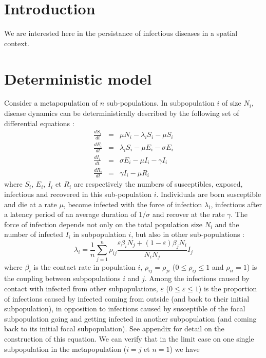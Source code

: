 \documentclass[a4paper,10pt]{article}
\begin{document}
\section{Introduction}

We are interested here in the persistance of infectious diseases in a spatial context.

\section{Deterministic model}

Consider a metapopulation of $n$ sub-populations. In subpopulation $i$ of size $N_i$, disease dynamics can be deterministically described by the following set of differential equations \cite{Anderson1991a}:
\begin{eqnarray}
  \frac{dS_{i}}{dt} & = & \mu N_{i}-\lambda_{i}S_{i}-\mu S_{i}\label{eq:dS} \\
  \frac{dE_{i}}{dt} & = & \lambda_{i}S_{i}-\mu E_{i}-\sigma E_{i} \\
  \frac{dI_{i}}{dt} & = & \sigma E_{i}-\mu I_{i}-\gamma I_{i}\label{eq:infectieux} \\
  \frac{dR_{i}}{dt} & = & \gamma I_{i}-\mu R_{i}\label{eq:dR}
\end{eqnarray}
where $S_i$, $E_i$, $I_i$ et $R_i$ are respectively the numbers of susceptibles, exposed, infectious and recovered in this sub-population $i$. Individuals are born susceptible and die at a rate $\mu$, become infected with the force of infection $\lambda_i$, infectious after a latency period of an average duration of $1/\sigma$ and recover at the rate $\gamma$. The force of infection depends not only on the total population size $N_i$ and the number of infected $I_i$ in subpopulation $i$, but also in other sub-populations \cite{Keeling2002b,Keeling2008b} :
\begin{equation} \label{eq:force}
  \lambda_i = \frac{1}{n}\sum_{j=1}^n\rho_{ij}\frac{\varepsilon \beta_iN_j+(1-\varepsilon)\beta_jN_i}{N_i N_j}I_j
\end{equation}
where $\beta_i$ is the contact rate in population $i$, $\rho_{ij}=\rho_{ji}$ ($0\leqslant\rho_{ij}\leqslant1$ and $\rho_{ii}=1$) is the coupling between subpopulations $i$ and $j$. Among the infections caused by contact with infected from other subpopulations, $\varepsilon$ ($0 \leqslant \varepsilon \leqslant 1$) is the proportion of infections caused by infected coming from outside (and back to their initial subpopulation), in opposition to infections caused by susceptible of the focal subpopulation going and getting infected in another subpopulation (and coming back to its initial focal subpopulation). See appendix for detail on the construction of this equation. We can verify that in the limit case on one single subpopulation in the metapopulation ($i=j$ et $n=1$) we have
\end{document}
